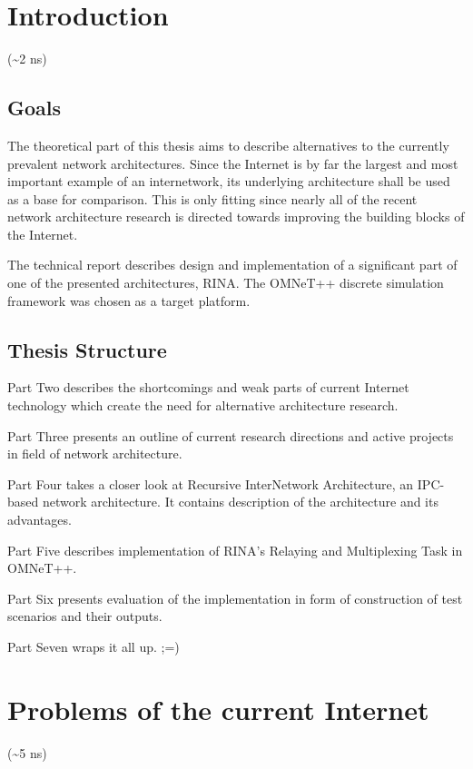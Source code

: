 
\chapter{Introduction}
    (\textasciitilde2 ns)



    \section{Goals}
        The theoretical part of this thesis aims to describe alternatives to the currently prevalent network architectures. Since the Internet is by far the largest and most important example of an internetwork, its underlying architecture shall be used as a base for comparison. This is only fitting since nearly all of the recent network architecture research is directed towards improving the building blocks of the Internet.

        The technical report describes design and implementation of a significant part of one of the presented architectures, RINA. The OMNeT++ discrete simulation framework was chosen as a target platform.

    \section{Thesis Structure}

        Part Two describes the shortcomings and weak parts of current Internet technology which create the need for alternative architecture research.

        Part Three presents an outline of current research directions and active projects in field of network architecture.

        Part Four takes a closer look at Recursive InterNetwork Architecture, an IPC-based network architecture. It contains description of the architecture and its advantages.

        Part Five describes implementation of RINA's Relaying and Multiplexing Task in OMNeT++.

        Part Six presents evaluation of the implementation in form of construction of test scenarios and their outputs.

        Part Seven wraps it all up. ;=)

\chapter{Problems of the current Internet}
    (\textasciitilde5 ns)

